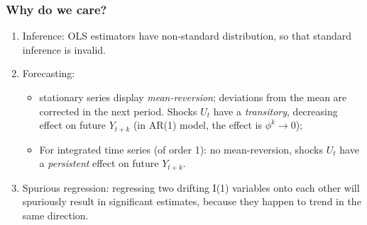 \begin{frame}
\frametitle{Why do we care?}
\begin{enumerate}
\item Inference: OLS estimators have non-standard distribution, so that standard inference is invalid.
\item Forecasting:
\begin{itemize}
\item stationary series display \emph{\color{red}mean-reversion}; deviations from
the mean are corrected in the next period. Shocks $U_{t}$ have a \emph{\color{red}transitory}, decreasing effect
on future $Y_{t+k}$ (in AR(1) model, the effect is $\phi ^{k}\rightarrow 0$);
\item For integrated time series (of order 1): no mean-reversion, shocks $U_{t}$ have a \emph{\color{red}persistent} effect on future $Y_{t+k}$.
\end{itemize}
\item Spurious regression: regressing two drifting I(1) variables onto each other will spuriously result in significant estimates, because they happen to trend in the same direction.
\end{enumerate}
\end{frame}



